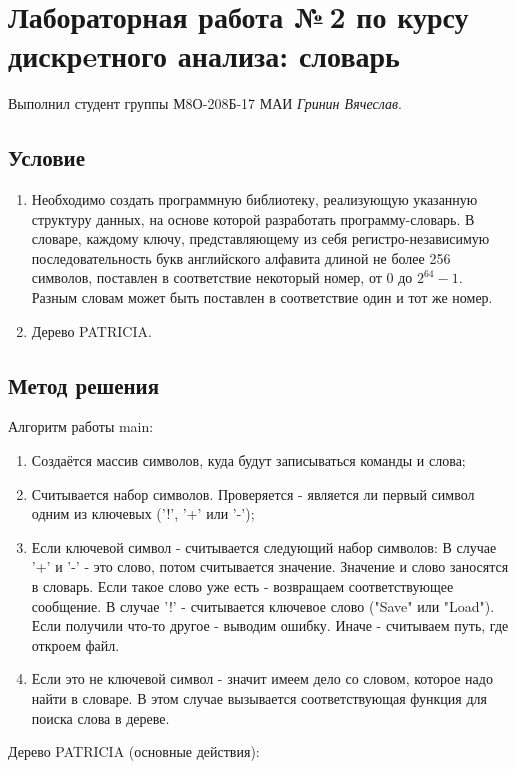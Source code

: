 \documentclass[12pt]{article}
\begin{document}
\section*{Лабораторная работа №\,2 по курсу дискрeтного анализа: словарь}

Выполнил студент группы М8О-208Б-17 МАИ \textit{Гринин Вячеслав}.

\subsection*{Условие}
\begin{enumerate}
	\item Необходимо создать программную библиотеку, реализующую указанную структуру данных, на основе которой разработать программу-словарь. В словаре, каждому ключу, представляющему из себя регистро-независимую последовательность букв английского алфавита длиной не более 256 символов, поставлен в соответствие некоторый номер, от $0$ до $2^64 - 1$. Разным словам может быть поставлен в соответствие один и тот же номер.
	\item Дерево PATRICIA. 
\end{enumerate}

\subsection*{Метод решения}

Алгоритм работы main:
\begin{enumerate}
	\item Создаётся массив символов, куда будут записываться команды и слова;
	\item Считывается набор символов. Проверяется - является ли первый символ одним из ключевых ('!', '+' или '-');
	\item Если ключевой символ - считывается следующий набор символов:
		\subitem В случае '+' и '-' - это слово, потом считывается значение. Значение и слово заносятся в словарь. Если такое слово уже есть - возвращаем соответствующее сообщение. 
		\subitem В случае '!' - считывается ключевое слово ("Save" или "Load"). Если получили что-то другое - выводим ошибку. Иначе - считываем путь, где откроем файл.
	\item Если это не ключевой символ - значит имеем дело со словом, которое надо найти в словаре. В этом случае вызывается соответствующая функция для поиска слова в дереве.
\end{enumerate}

Дерево PATRICIA (основные действия):
\end{document}
